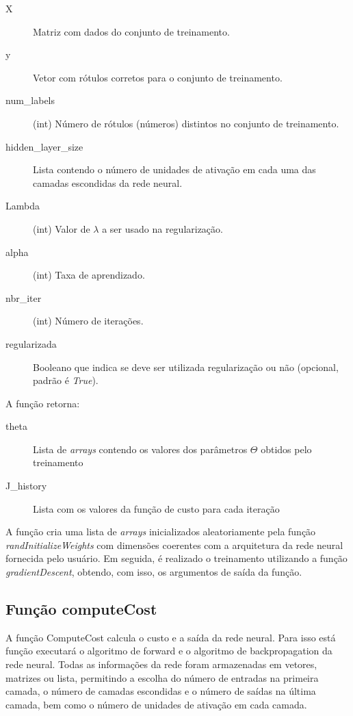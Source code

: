 \documentclass[12pt]{article}
\begin{document}
\begin{description}
\item[X] Matriz com dados do conjunto de treinamento.

\item[y] Vetor com rótulos corretos para o conjunto de treinamento.

\item[num\_labels] (int) Número de rótulos (números) distintos no conjunto de treinamento.

\item[hidden\_layer\_size] Lista contendo o número de unidades de ativação em cada uma das camadas escondidas da rede neural.

\item[Lambda] (int) Valor de $\lambda$ a ser usado na regularização.

\item[alpha] (int) Taxa de aprendizado.

\item[nbr\_iter] (int) Número de iterações.

\item[regularizada] Booleano que indica se deve ser utilizada regularização ou não (opcional, padrão é \textit{True}).
\end{description}

A função retorna:

\begin{description}
\item[theta] Lista de \textit{arrays} contendo os valores dos parâmetros $\Theta$ obtidos pelo treinamento

\item[J\_history] Lista com os valores da função de custo para cada iteração
\end{description}

A função cria uma lista de \textit{arrays} inicializados aleatoriamente pela função \textit{randInitializeWeights} com dimensões coerentes com a arquitetura da rede neural fornecida pelo usuário. Em seguida, é realizado o treinamento utilizando a função \textit{gradientDescent}, obtendo, com isso, os argumentos de saída da função.

\subsection{Função computeCost}
A função ComputeCost calcula o custo e a saída da rede neural. Para isso está função executará o algoritmo de forward e o algoritmo de backpropagation da rede neural. Todas as informações da rede foram armazenadas em vetores, matrizes ou lista, permitindo a escolha do número de entradas na primeira camada, o número de camadas escondidas e o número de saídas na última camada, bem como o número de unidades de ativação em cada camada.
\end{document}
